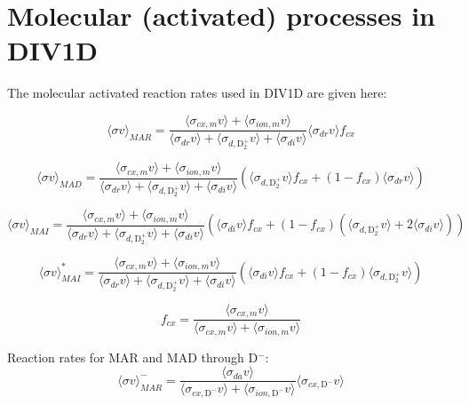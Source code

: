 \documentclass[amsmath,amssymb,a4]{revtex4-2}
\begin{document}
\newpage 
\section{Molecular (activated) processes in DIV1D}
\label{sec: MA rates}

The molecular activated reaction rates used in DIV1D are given here: 


\begin{equation}
    \langle\sigma v\rangle_{MAR} = \frac{\langle\sigma_{cx,m} v\rangle +  \langle\sigma_{ion,m} v\rangle}{ \langle\sigma_{dr} v\rangle +  \langle\sigma_{d,\mathrm{D}_2^+} v\rangle  +  \langle\sigma_{di} v\rangle }\langle\sigma_{dr} v\rangle f_{cx}
\end{equation}

\begin{equation}
    \langle\sigma v\rangle_{MAD} = \frac{\langle\sigma_{cx,m} v\rangle +  \langle\sigma_{ion,m} v\rangle}{ \langle\sigma_{dr} v\rangle +  \langle\sigma_{d,\mathrm{D}_2^+} v\rangle  +  \langle\sigma_{di} v\rangle }(\langle\sigma_{d,\mathrm{D}_2^+}v\rangle f_{cx} + (1-f_{cx})\langle\sigma_{dr} v\rangle)
\end{equation}

\begin{equation}
    \langle\sigma v\rangle_{MAI} = \frac{\langle\sigma_{cx,m} v\rangle +  \langle\sigma_{ion,m} v\rangle}{ \langle\sigma_{dr} v\rangle +  \langle\sigma_{d,\mathrm{D}_2^+} v\rangle  +  \langle\sigma_{di} v\rangle }(\langle\sigma_{di} v\rangle f_{cx} + (1-f_{cx})(\langle\sigma_{d,\mathrm{D}_2^+}v\rangle+ 2\langle\sigma_{di} v\rangle))
\end{equation}

\begin{equation}
    \langle\sigma v\rangle_{MAI}^* = \frac{\langle\sigma_{cx,m} v\rangle +  \langle\sigma_{ion,m} v\rangle}{ \langle\sigma_{dr} v\rangle +  \langle\sigma_{d,\mathrm{D}_2^+} v\rangle  +  \langle\sigma_{di} v\rangle }(\langle\sigma_{di} v\rangle f_{cx} + (1-f_{cx})\langle\sigma_{d,\mathrm{D}_2^+}v\rangle)
\end{equation}

\begin{equation}
    f_{cx} = \frac{\langle\sigma_{cx,m} v\rangle}{\langle\sigma_{cx,m} v\rangle + \langle\sigma_{ion,m} v\rangle}
\end{equation}

Reaction rates for MAR and MAD through D$^-$: 
\begin{equation}
    \langle\sigma v\rangle_{MAR}^- = \frac{\langle\sigma_{da} v\rangle}{  \langle \sigma_{cx,\mathrm{D}^-} v\rangle  +  \langle \sigma_{ion,\mathrm{D}^-} v\rangle}\langle \sigma_{cx,\mathrm{D}^-} v\rangle
\end{equation}
\end{document}
